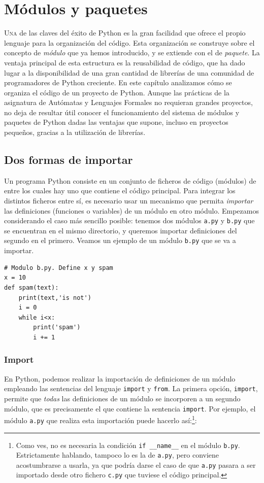 
\chapter{Módulos y paquetes}\label{chap:modulosPaquetes}

\lettrine[lines=5]{U}{na} de las claves del éxito de Python es la gran facilidad que ofrece el propio lenguaje para la organización del código. Esta organización se construye sobre el concepto de \emph{módulo} que ya hemos introducido, y se extiende con el de \emph{paquete}. La ventaja principal de esta estructura es la reusabilidad de código, que ha dado lugar a la disponibilidad de una gran cantidad de librerías de una comunidad de programadores de Python creciente. En este capítulo analizamos cómo se organiza el código de un proyecto de Python. Aunque las prácticas de la asignatura de Autómatas y Lenguajes Formales no requieran grandes proyectos, no deja de resultar útil conocer el funcionamiento del sistema de módulos y paquetes de Python dadas las ventajas que supone, incluso en proyectos pequeños, gracias a la utilización de librerías.

\section{Dos formas de importar}

Un programa Python consiste en un conjunto de ficheros de código (módulos) de entre los cuales hay uno que contiene el código principal. Para integrar los distintos ficheros entre sí, es necesario usar un mecanismo que permita \emph{importar} las definiciones (funciones o variables) de un módulo en otro módulo. Empezamos considerando el caso más sencillo posible: tenemos dos módulos \texttt{a.py} y \texttt{b.py} que se encuentran en el mismo directorio, y queremos importar definiciones del segundo en el primero. Veamos un ejemplo de un módulo \texttt{b.py} que se va a importar. 

\begin{lstlisting}
# Modulo b.py. Define x y spam
x = 10
def spam(text):
    print(text,'is not')
    i = 0
    while i<x:
        print('spam')
        i += 1
\end{lstlisting}

\subsection{Import}

En Python, podemos realizar la importación de definiciones de un módulo empleando las sentencias del lenguaje \texttt{import} y \texttt{from}. La primera opción, \texttt{import}, permite que \emph{todas} las definiciones de un módulo se incorporen a un segundo módulo, que es precisamente el que contiene la sentencia \texttt{import}. Por ejemplo, el módulo \texttt{a.py} que realiza esta importación puede hacerlo así:\footnote{Como ves, no es necesaria la condición \texttt{if \_\_name\_\_} en el módulo \texttt{b.py}. Estrictamente hablando, tampoco lo es la de \texttt{a.py}, pero conviene acostumbrarse a usarla, ya que podría darse el caso de que \texttt{a.py} pasara a ser importado desde otro fichero \texttt{c.py} que tuviese el código principal.}:

